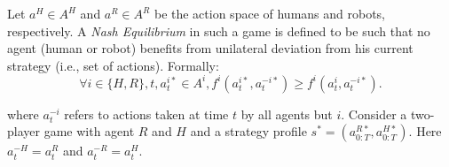 \documentclass[letterpaper, 10 pt, conference]{ieeeconf}  %
\begin{document}
Let $a^H \in A^H$ and $a^R \in A^R$ be the action space of humans and robots, 
respectively. A \textit{Nash Equilibrium} in such a game is defined to be such that no agent (human or robot) benefits from unilateral deviation from his current strategy (i.e., set of actions). Formally:
\begin{equation}
	\forall i \in \{H,R\}, t,a^{i*}_t \in A^i, f^i(a^{i*}_t,a^{-i*}_t) \geq f^i(a^{i}_t,a^{-i*}_t). 
\end{equation}

where $a^{-i}_t$ refers to actions taken at time $t$ by all agents but $i$.
Consider a two-player game with agent $R$ and $H$ and a strategy profile $s^* = (a^{R*}_{0:T},a^{H*}_{0:T})$. Here $a_t^{-H} = a_t^R$ and $a_t^{-R} = a_t^H$. 

 

\end{document}
